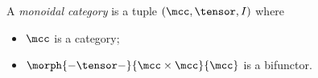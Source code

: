 \begin{definition}
    A \emph{monoidal category} is a tuple \((\mcc, \tensor, I)\) where
    \begin{itemize}
        \item \(\mcc\) is a category;
        \item \(\morph{- \tensor -}{\mcc \times \mcc}{\mcc}\) is a bifunctor.
    \end{itemize}
\end{definition}